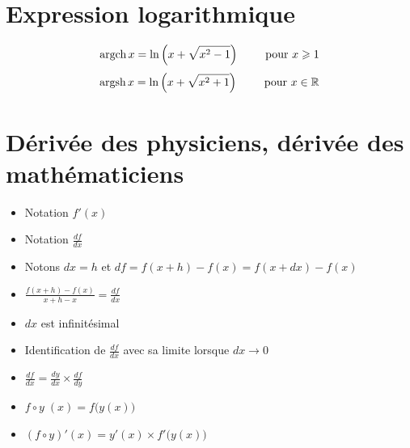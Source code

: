 \section{Expression logarithmique}

\begin{frame}

\begin{proposition}
$$\mathop{\text{argch}}\nolimits x  =  \ln\left( x+\sqrt{x^2-1} \right) \qquad \text{ pour } x\geqslant1$$
$$\mathop{\text{argsh}}\nolimits x  =  \ln\left( x+\sqrt{x^2+1} \right) \qquad \text{ pour } x \in \mathbb{R}$$
\end{proposition}

\end{frame}




\section{Dérivée des physiciens, dérivée des mathématiciens}

\begin{frame}


\begin{itemize}
  \item Notation $f'(x)$

\vspace*{-3ex}
\end{itemize}




\begin{itemize}
  \item Notation $\frac{df}{dx}$
  \pause\pause
  \item Notons $dx = h$ et $df = f(x+h)-f(x) = f(x+dx)-f(x)$
  \pause
  \item $\frac{f(x+h)-f(x)}{x+h-x} = \frac{df}{dx}$
  \pause
  \item $dx$ est infinitésimal
  \pause
  \item Identification de $\frac{df}{dx}$ avec sa limite lorsque $dx \to 0$
\end{itemize}

\pause
\medskip
{}
\pause
\begin{itemize}
  \item $\displaystyle \frac{df}{dx} = \frac{dy}{dx}\times\frac{df}{dy}$
  \pause  
  \item $f \circ y \; (x) = f\big( y(x) \big)$
  \pause
  \item $\left(f \circ y \right)'(x) = y'(x) \times f'\big( y(x) \big)$
\end{itemize}


\end{frame}



